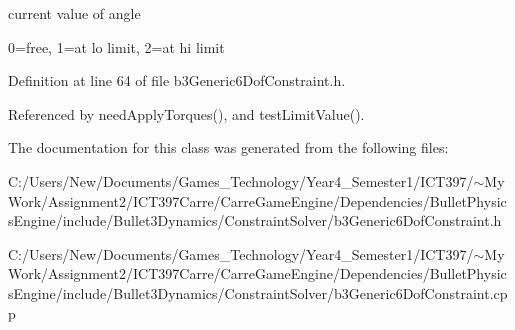current value of angle 

0=free, 1=at lo limit, 2=at hi limit 

Definition at line 64 of file b3Generic6DofConstraint.h.

Referenced by needApplyTorques(), and testLimitValue().

The documentation for this class was generated from the following files:\begin{CompactItemize}
\item 
C:/Users/New/Documents/Games\_\-Technology/Year4\_\-Semester1/ICT397/$\sim$My Work/Assignment2/ICT397Carre/CarreGameEngine/Dependencies/BulletPhysicsEngine/include/Bullet3Dynamics/ConstraintSolver/b3Generic6DofConstraint.h\item 
C:/Users/New/Documents/Games\_\-Technology/Year4\_\-Semester1/ICT397/$\sim$My Work/Assignment2/ICT397Carre/CarreGameEngine/Dependencies/BulletPhysicsEngine/include/Bullet3Dynamics/ConstraintSolver/b3Generic6DofConstraint.cpp\end{CompactItemize}

